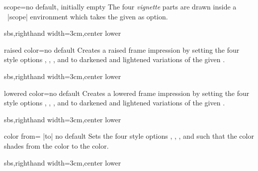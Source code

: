 \begin{vigTcbKey}[][doc new=2016-05-24]{scope}{=}{no default, initially empty}
  The four \emph{vignette} parts are drawn inside a \tikzname\ |scope|
  environment which takes the given  as option.
\begin{dispExample*}{sbs,righthand width=3cm,center lower}
\end{dispExample*}
\end{vigTcbKey}



\begin{vigTcbKey}[][doc new=2016-04-22]{raised color}{=}{no default}
  Creates a raised frame impression by setting the four style options
  ,
  ,
  , and
  to darkened and lightened variations of the given .
\begin{dispExample*}{sbs,righthand width=3cm,center lower}
\end{dispExample*}
\end{vigTcbKey}


\begin{vigTcbKey}[][doc new=2016-04-22]{lowered color}{=}{no default}
  Creates a lowered frame impression by setting the four style options
  ,
  ,
  , and
  to darkened and lightened variations of the given .
\begin{dispExample*}{sbs,righthand width=3cm,center lower}
\end{dispExample*}
\end{vigTcbKey}


\begin{vigTcbKey}[][doc new=2016-04-22]{color from}{= |to| }{no default}
  Sets the four style options
  ,
  ,
  , and
  such that the color shades from the
   color to the  color.
\begin{dispExample*}{sbs,righthand width=3cm,center lower}
\end{dispExample*}
\end{vigTcbKey}



